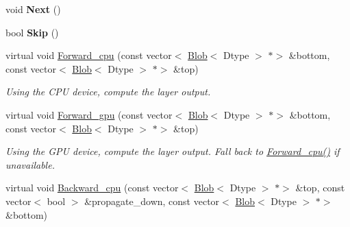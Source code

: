 \begin{DoxyCompactItemize}
\item 
\mbox{\label{classcaffe_1_1_h_d_f5_data_layer_a06dd19f9e75448e649bd6d1bdf628879}} 
void {\bfseries Next} ()
\item 
\mbox{\label{classcaffe_1_1_h_d_f5_data_layer_ad8fcb05eb70f5230d34b4dc1e641bc7b}} 
bool {\bfseries Skip} ()
\item 
\mbox{\label{classcaffe_1_1_h_d_f5_data_layer_a6ee944e4d80a76a13e955c36f33a2cee}} 
virtual void \mbox{\hyperlink{classcaffe_1_1_h_d_f5_data_layer_a6ee944e4d80a76a13e955c36f33a2cee}{Forward\+\_\+cpu}} (const vector$<$ \mbox{\hyperlink{classcaffe_1_1_blob}{Blob}}$<$ Dtype $>$ $\ast$$>$ \&bottom, const vector$<$ \mbox{\hyperlink{classcaffe_1_1_blob}{Blob}}$<$ Dtype $>$ $\ast$$>$ \&top)
\begin{DoxyCompactList}\small\item\em Using the C\+PU device, compute the layer output. \end{DoxyCompactList}\item 
\mbox{\label{classcaffe_1_1_h_d_f5_data_layer_a9147be08e6e0c9b0300ddad220903fc6}} 
virtual void \mbox{\hyperlink{classcaffe_1_1_h_d_f5_data_layer_a9147be08e6e0c9b0300ddad220903fc6}{Forward\+\_\+gpu}} (const vector$<$ \mbox{\hyperlink{classcaffe_1_1_blob}{Blob}}$<$ Dtype $>$ $\ast$$>$ \&bottom, const vector$<$ \mbox{\hyperlink{classcaffe_1_1_blob}{Blob}}$<$ Dtype $>$ $\ast$$>$ \&top)
\begin{DoxyCompactList}\small\item\em Using the G\+PU device, compute the layer output. Fall back to \mbox{\hyperlink{classcaffe_1_1_h_d_f5_data_layer_a6ee944e4d80a76a13e955c36f33a2cee}{Forward\+\_\+cpu()}} if unavailable. \end{DoxyCompactList}\item 
\mbox{\label{classcaffe_1_1_h_d_f5_data_layer_ab2a3379c83003ab3fa19848fbc57d30a}} 
virtual void \mbox{\hyperlink{classcaffe_1_1_h_d_f5_data_layer_ab2a3379c83003ab3fa19848fbc57d30a}{Backward\+\_\+cpu}} (const vector$<$ \mbox{\hyperlink{classcaffe_1_1_blob}{Blob}}$<$ Dtype $>$ $\ast$$>$ \&top, const vector$<$ bool $>$ \&propagate\+\_\+down, const vector$<$ \mbox{\hyperlink{classcaffe_1_1_blob}{Blob}}$<$ Dtype $>$ $\ast$$>$ \&bottom)

\end{DoxyCompactItemize}
